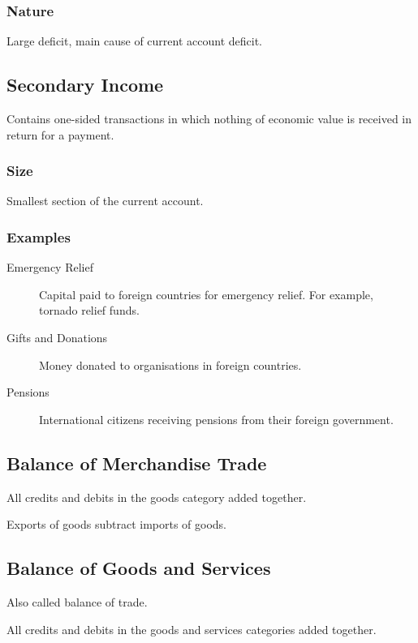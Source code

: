 \documentclass[a4paper,11pt]{article}
\begin{document}
\subsubsection{Nature}

Large deficit, main cause of current account deficit.


\subsection{Secondary Income}

Contains one-sided transactions in which nothing of economic value is received
in return for a payment.


\subsubsection{Size}

Smallest section of the current account.


\subsubsection{Examples}

\begin{description}
\item [Emergency Relief] Capital paid to foreign countries for emergency
	relief. For example, tornado relief funds.
\item [Gifts and Donations] Money donated to organisations in foreign countries.
\item [Pensions] International citizens receiving pensions from their foreign
	government.
\end{description}


\subsection{Balance of Merchandise Trade}

All credits and debits in the goods category added together.

Exports of goods subtract imports of goods.


\subsection{Balance of Goods and Services}

Also called balance of trade.

All credits and debits in the goods and services categories added together.
\end{document}
